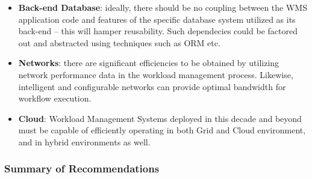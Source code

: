 \begin{itemize}
\begin{itemize}
\end{itemize}

\item \textbf{Back-end Database}: ideally, there should be no coupling between the WMS application code and features of the specific database system
utilized as its back-end -- this will hamper reusability. Such dependecies could be factored out and abstracted using techniques such as ORM etc.

\item \textbf{Networks}: there are significant efficiencies to be obtained by utilizing network performance data in the workload management process. Likewise,
intelligent and configurable networks can provide optimal bandwidth for workflow execution.

\item \textbf{Cloud}: Workload Management Systems deployed in this decade and beyond must be capable of efficiently operating in both Grid and Cloud environment,
and in hybrid environments as well.

\end{itemize}

\subsubsection{Summary of Recommendations}
